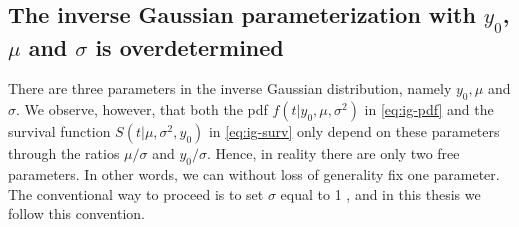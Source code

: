 \subsection{The inverse Gaussian parameterization with $y_0$, $\mu$ and $\sigma$ is overdetermined}
\label{subsec:overdetermined}
There are three parameters in the inverse Gaussian distribution, namely $y_0, \mu$ and $\sigma$.
We observe, however, that both the pdf $f(t|y_0,\mu,\sigma^2)$ in \eqref{eq:ig-pdf} and the survival function $S(t|\mu,\sigma^2,y_0)$ in \eqref{eq:ig-surv} only depend on these parameters through the ratios $\mu/\sigma$ and $y_0/\sigma$.
Hence, in reality there are only two free parameters.
In other words, we can without loss of generality fix one parameter.
The conventional way to proceed is to set $\sigma$ equal to 1 \citep{leewhitmore2006}, and in this thesis we follow this convention.

